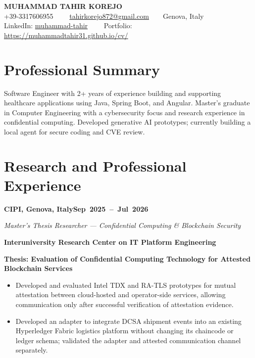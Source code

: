 \documentclass[a4paper]{article}
\newif\ifshowupworkavailability
\newcommand{\cventry}[3]{%
  \par\addvspace{3pt}\Needspace{3.5\baselineskip}%
  \textbf{#2}\hfill\mbox{\textbf{#3}}\par\nopagebreak
  \textit{#1}\par\nopagebreak
}
\begin{document}
\ifdefined\pdfinterwordspaceon
  \pdfinterwordspaceon
\fi
\begin{center}
  {\LARGE\bfseries MUHAMMAD TAHIR KOREJO}\\[5pt]
  {\small
  +39-3317606955~~\textbar~~%
  \href{mailto:tahirkorejo872@gmail.com}{tahirkorejo872@gmail.com}~~\textbar~~Genova, Italy\\[2pt]
  LinkedIn: \href{https://www.linkedin.com/in/muhammad-tahir-83a431204/}{muhammad-tahir}~~\textbar~~%
  Portfolio: \url{https://muhammadtahir31.github.io/cv/}}
\end{center}
\vspace{-4pt}

\section{Professional Summary}
Software Engineer with 2+ years of experience building and supporting healthcare
applications using Java, Spring Boot, and Angular. Master's graduate in Computer
Engineering with a cybersecurity focus and research experience in confidential
computing. Developed generative AI prototypes; currently building a local agent
for secure coding and CVE review.
\ifshowupworkavailability
\mbox{Available for freelance work via \href{https://www.upwork.com/freelancers/~01bba43fe979cc6574}{Upwork}.}
\fi

\section{Research and Professional Experience}

\cventry{Master's Thesis Researcher --- Confidential Computing \& Blockchain Security}
  {CIPI, Genova, Italy}{Sep 2025 -- Jul 2026}
\textbf{Interuniversity Research Center on IT Platform Engineering}\par
\textbf{Thesis: Evaluation of Confidential Computing Technology for Attested Blockchain Services}
\begin{itemize}
  \item Developed and evaluated Intel TDX and RA-TLS prototypes for mutual attestation between cloud-hosted and operator-side services, allowing communication only after successful verification of attestation evidence.
  \item Developed an adapter to integrate DCSA shipment events into an existing Hyperledger Fabric logistics platform without changing its chaincode or ledger schema; validated the adapter and attested communication channel separately.
\end{itemize}
\end{document}

